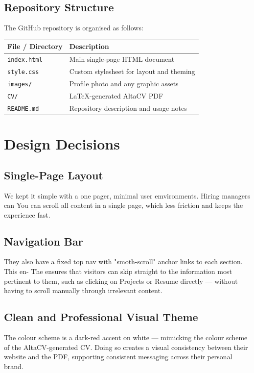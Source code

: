 \documentclass[12pt,a4paper]{article}
\begin{document}
\subsection{Repository Structure}
The GitHub repository is organised as follows:

\begin{center}
\begin{tabular}{@{}ll@{}}
\toprule
\textbf{File / Directory} & \textbf{Description} \\
\midrule
\texttt{index.html}       & Main single-page HTML document \\
\texttt{style.css}        & Custom stylesheet for layout and theming \\
\texttt{images/}          & Profile photo and any graphic assets \\
\texttt{CV/}              & LaTeX-generated AltaCV PDF \\
\texttt{README.md}        & Repository description and usage notes \\
\bottomrule
\end{tabular}
\end{center}

\section{Design Decisions}

\subsection{Single-Page Layout}
We kept it simple with a one pager, minimal user emvironments. Hiring managers can
You can scroll all content in a single page, which less friction 
and keeps the experience fast.

\subsection{Navigation Bar}
They also have a fixed top nav with "smoth-scroll" anchor links to each section. This en-
The ensures that visitors can skip straight to the information most pertinent to them, such as
clicking on Projects or Resume directly — without having to scroll manually through irrelevant content.

\subsection{Clean and Professional Visual Theme}
The colour scheme is a dark-red accent on white — mimicking the colour scheme of the AltaCV-generated CV. Doing so creates a visual consistency between their website and the PDF, supporting consistent messaging across their personal brand.
\end{document}
